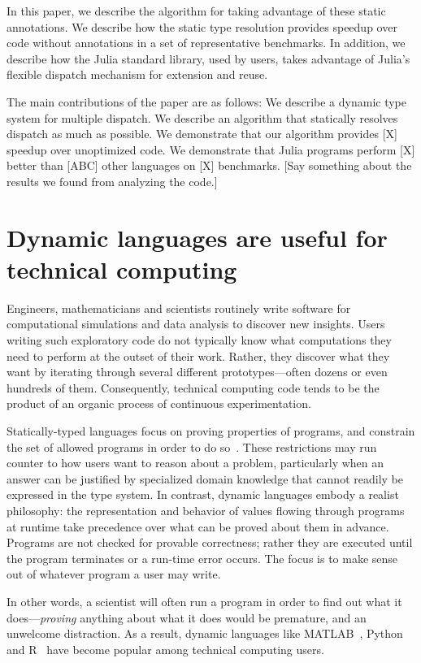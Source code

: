 In this paper, we describe the algorithm for taking advantage of these static annotations. We describe how the static type resolution provides  speedup over code without annotations in a set of representative benchmarks. In addition, we describe how the Julia standard library, used by  users, takes advantage of Julia's flexible dispatch mechanism for extension and reuse.

The main contributions of the paper are as follows:
We describe a dynamic type system for multiple dispatch.
We describe an algorithm that statically resolves dispatch as much as possible.
We demonstrate that our algorithm provides [X] speedup over unoptimized code.
We demonstrate that Julia programs perform [X] better than [ABC] other languages on [X] benchmarks.
[Say something about the results we found from analyzing the code.]


\section{Dynamic languages are useful for technical computing}

Engineers, mathematicians and scientists routinely write software for
computational simulations and data analysis to discover new insights.
Users writing such exploratory code do not typically
know what computations they need to perform at the outset of their work.
Rather, they discover what they want by iterating through several different
prototypes---often dozens or even hundreds of them. Consequently, technical
computing code tends to be the product of an organic process of continuous
experimentation.

Statically-typed languages focus on proving properties of programs, and constrain
the set of allowed programs in order to do so~\cite{Pierce2002}.
These restrictions may run counter to how users want to reason about a problem,
particularly when an answer can be justified by specialized domain knowledge that
cannot readily be expressed in the type system.
In contrast, dynamic languages embody a realist philosophy:
the representation and behavior of values flowing through programs at runtime
take precedence over what can be proved about them in advance.
Programs are not checked for provable correctness;
rather they are executed until the program terminates or a run-time error occurs.
The focus is to make sense out of whatever program a user may write.

In other words, a scientist will often run a program in order to find out what
it does---\emph{proving} anything about what it does would be premature, and an
unwelcome distraction. As a result, dynamic languages like
MATLAB~\cite{matlab}, Python~\cite{pythonlib,pythonref} and R~\cite{rlang} have
become popular among technical computing users.

